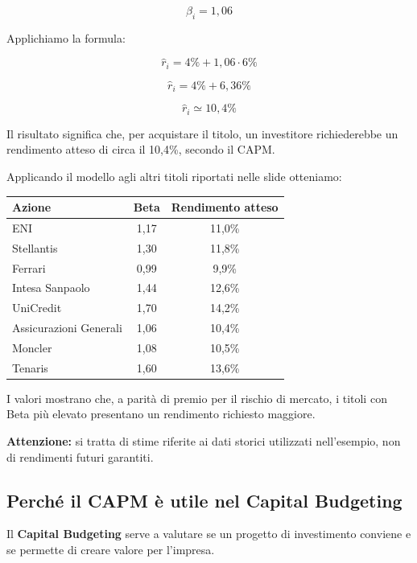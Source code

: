 \[
\beta_i=1{,}06
\]

\noindent Applichiamo la formula:

\[
\hat{r}_i=4\%+1{,}06\cdot6\%
\]

\[
\hat{r}_i=4\%+6{,}36\%
\]

\[
\boxed{\hat{r}_i\simeq10{,}4\%}
\]

\noindent Il risultato significa che,
per acquistare il titolo, un investitore
richiederebbe un rendimento atteso
di circa il 10,4\%, secondo il CAPM.

\medskip

\noindent Applicando il modello agli altri
titoli riportati nelle slide otteniamo:

\begin{center}
\begin{tabular}{|l|c|c|}
\hline
\textbf{Azione} &
\textbf{Beta} &
\textbf{Rendimento atteso} \\
\hline
ENI & 1,17 & 11,0\% \\
\hline
Stellantis & 1,30 & 11,8\% \\
\hline
Ferrari & 0,99 & 9,9\% \\
\hline
Intesa Sanpaolo & 1,44 & 12,6\% \\
\hline
UniCredit & 1,70 & 14,2\% \\
\hline
Assicurazioni Generali & 1,06 & 10,4\% \\
\hline
Moncler & 1,08 & 10,5\% \\
\hline
Tenaris & 1,60 & 13,6\% \\
\hline
\end{tabular}
\end{center}

\noindent I valori mostrano che,
a parità di premio per il rischio di mercato,
i titoli con Beta più elevato presentano
un rendimento richiesto maggiore.

\medskip

\noindent \textbf{Attenzione:} si tratta di stime
riferite ai dati storici utilizzati nell'esempio,
non di rendimenti futuri garantiti.


\subsection{Perché il CAPM è utile nel Capital Budgeting}

\noindent Il \textbf{Capital Budgeting} serve a valutare
se un progetto di investimento conviene
e se permette di creare valore per l'impresa.

\medskip

